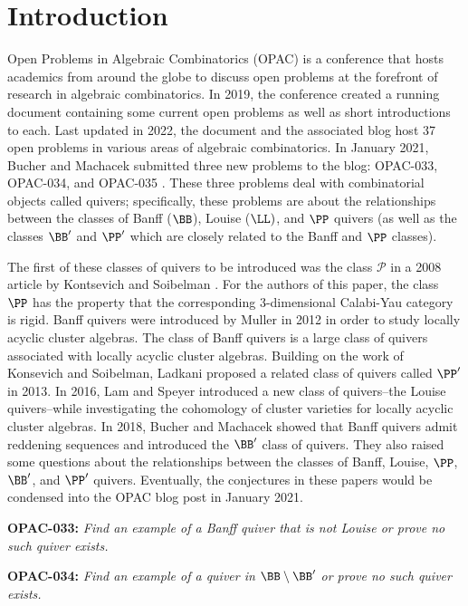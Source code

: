 \section{Introduction} \label{sec-introduction}
Open Problems in Algebraic Combinatorics (OPAC) is a conference that hosts academics from around the globe to discuss open problems at the forefront of research in algebraic combinatorics.
In 2019, the conference created a running document containing some current open problems as well as short introductions to each. 
Last updated in 2022, the document and the associated blog host 37 open problems in various areas of algebraic combinatorics. 
In January 2021, Bucher and Machacek submitted three new problems to the blog: OPAC-033, OPAC-034, and OPAC-035 \cite{bucher_banff_2021}. 
These three problems deal with combinatorial objects called quivers; specifically, these problems are about the relationships between the classes of Banff ($\BB$), Louise ($\LL)$, and $\PP$ quivers (as well as the classes $\BB'$ and $\PP'$ which are closely related to the Banff and $\PP$ classes).

The first of these classes of quivers to be introduced was the class $\mathcal{P}$ in a 2008 article by Kontsevich and Soibelman \cite{kontsevich_stability_2008}. For the authors of this paper, the class $\PP$ has the property that the corresponding 3-dimensional Calabi-Yau category is rigid. 
Banff quivers were introduced by Muller \cite{MR2995670} in 2012 in order to study locally acyclic cluster algebras. 
The class of Banff quivers is a large class of quivers associated with locally acyclic cluster algebras.
Building on the work of Konsevich and Soibelman, Ladkani \cite{ladkani_cluster_2013} proposed a related class of quivers called $\PP'$ in 2013.
In 2016, Lam and Speyer \cite{MR4384567} introduced a new class of quivers--the Louise quivers--while investigating the cohomology of cluster varieties for locally acyclic cluster algebras.
In 2018, Bucher and Machacek \cite{MR4108215} showed that Banff quivers admit reddening sequences and introduced the $\BB'$ class of quivers.
They also raised some questions about the relationships between the classes of Banff, Louise, $\PP$, $\BB'$, and $\PP'$ quivers.
Eventually, the conjectures in these papers would be condensed into the OPAC blog post in January 2021. 

\textbf{OPAC-033:} \textit{Find an example of a Banff quiver that is not Louise or prove no such quiver exists.} 

\textbf{OPAC-034:} \textit{Find an example of a quiver in $\BB \setminus \BB'$  or prove no such quiver exists.}


